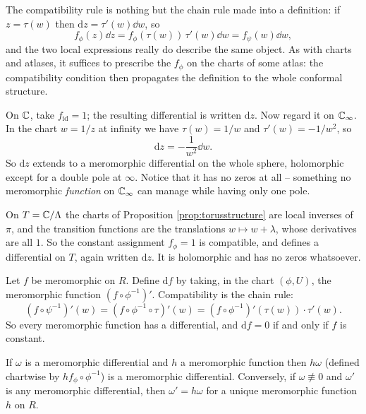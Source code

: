 \documentclass[a4paper]{scrartcl}
\newcommand{\id}{\operatorname{id}}
\newcommand{\Cinf}{\C_\infty}
\begin{document}
The compatibility rule is nothing but the chain rule made into a definition: if
$z = \tau(w)$ then $\mathrm{d}z = \tau'(w)\dd w$, so
$$
f_\phi(z)\dd z = f_\phi(\tau(w))\,\tau'(w)\dd w = f_\psi(w)\dd w,
$$
and the two local expressions really do describe the same object. As with charts and
atlases, it suffices to prescribe the $f_\phi$ on the charts of some atlas: the
compatibility condition then propagates the definition to the whole conformal structure.

\begin{example}\label{ex:dzonsphere}
	On $\mathbb{C}$, take $f_{\id} = 1$; the resulting differential is written $\mathrm{d}z$. Now regard
	it on $\Cinf$. In the chart $w = 1/z$ at infinity we have $\tau(w) = 1/w$ and
	$\tau'(w) = -1/w^2$, so
	$$
	\mathrm{d}z = -\frac{1}{w^2}\dd w.
	$$
	So $\mathrm{d}z$ extends to a meromorphic differential on the whole sphere, holomorphic
	except for a double pole at $\infty$. Notice that it has no zeros at all -- something
	no meromorphic \emph{function} on $\Cinf$ can manage while having only one pole.
\end{example}

\begin{example}\label{ex:dzontorus}
	On $T = \mathbb{C}/\Lambda$ the charts of Proposition \ref{prop:torusstructure} are local
	inverses of $\pi$, and the transition functions are the translations
	$w \mapsto w + \lambda$, whose derivatives are all $1$. So the constant assignment
	$f_\phi = 1$ is compatible, and defines a differential on $T$, again written $\mathrm{d}z$.
	It is holomorphic and has no zeros whatsoever.
\end{example}

\begin{example}
	Let $f$ be meromorphic on $R$. Define $\mathrm{d}f$ by taking, in the chart $(\phi,U)$, the
	meromorphic function $(f\circ\phi^{-1})'$. Compatibility is the chain rule:
	$$
	(f\circ\psi^{-1})'(w) = \left(f\circ\phi^{-1}\circ\tau\right)'(w)
	= (f\circ\phi^{-1})'(\tau(w))\cdot\tau'(w).
	$$
	So every meromorphic function has a differential, and $\mathrm{d}f = 0$ if and only if $f$ is
	constant.
\end{example}

\begin{lemma}\label{lem:diffmodule}
	If $\omega$ is a meromorphic differential and $h$ a meromorphic function then $h\omega$
	(defined chartwise by $hf_\phi\circ\phi^{-1}$) is a meromorphic differential.
	Conversely, if $\omega \not\equiv 0$ and $\omega'$ is any meromorphic differential,
	then $\omega' = h\omega$ for a unique meromorphic function $h$ on $R$.
\end{lemma}
\end{document}
